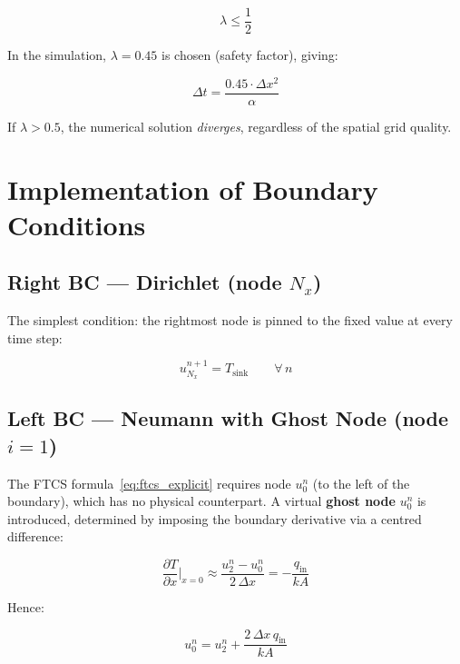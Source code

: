 \documentclass[11pt, a4paper]{scrartcl}
\begin{document}
\begin{onehalfspace}
\begin{equation}
  \lambda \leq \frac{1}{2}
  \label{eq:stability}
\end{equation}

In the simulation, $\lambda = 0.45$ is chosen (safety factor), giving:

\begin{equation}
  \Delta t = \frac{0.45 \cdot \Delta x^2}{\alpha}
  \label{eq:dt}
\end{equation}

If $\lambda > 0.5$, the numerical solution \emph{diverges}, regardless of the spatial grid quality.

\section{Implementation of Boundary Conditions}

\subsection{Right BC — Dirichlet (node $N_x$)}

The simplest condition: the rightmost node is pinned to the fixed value at every time step:

\begin{equation}
  u_{N_x}^{n+1} = T_\text{sink} \qquad \forall\, n
  \label{eq:dirichlet_impl}
\end{equation}

\subsection{Left BC — Neumann with Ghost Node (node $i=1$)}

The FTCS formula~\eqref{eq:ftcs_explicit} requires node $u_0^n$ (to the left of the boundary), which has no physical counterpart. A virtual \textbf{ghost node} $u_0^n$ is introduced, determined by imposing the boundary derivative via a centred difference:

\begin{equation}
  \frac{\partial T}{\partial x}\bigg|_{x=0} \approx \frac{u_2^n - u_0^n}{2\,\Delta x} = -\frac{q_\text{in}}{k A}
\end{equation}

Hence:

\begin{equation}
  u_0^n = u_2^n + \frac{2\,\Delta x\, q_\text{in}}{k A}
  \label{eq:ghost}
\end{equation}


\end{onehalfspace}
\end{document}
